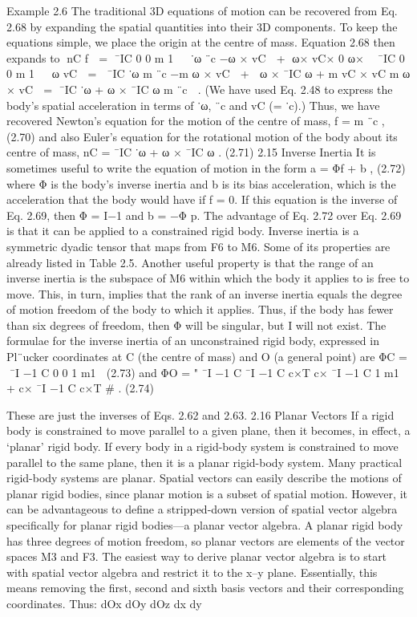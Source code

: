 Example 2.6 The traditional 3D equations of motion can be recovered from Eq. 2.68 by expanding the spatial quantities into their 3D components. To keep the equations simple, we place the origin at the centre of mass. Equation 2.68 then expands to nC f  = ¯IC 0 0 m 1   ˙ω ¨c −ω × vC  + ω× vC× 0 ω×  ¯IC 0 0 m 1   ω vC  =  ¯IC ˙ω m ¨c −m ω × vC  +  ω × ¯IC ω + m vC × vC m ω × vC  = ¯IC ˙ω + ω × ¯IC ω m ¨c  . (We have used Eq. 2.48 to express the body’s spatial acceleration in terms of ˙ω, ¨c and vC (= ˙c).) Thus, we have recovered Newton’s equation for the motion of the centre of mass, f = m ¨c , (2.70) and also Euler’s equation for the rotational motion of the body about its centre of mass, nC = ¯IC ˙ω + ω × ¯IC ω . (2.71) 2.15 Inverse Inertia It is sometimes useful to write the equation of motion in the form a = Φf + b , (2.72) where Φ is the body’s inverse inertia and b is its bias acceleration, which is the acceleration that the body would have if f = 0. If this equation is the inverse of Eq. 2.69, then Φ = I−1 and b = −Φ p. The advantage of Eq. 2.72 over Eq. 2.69 is that it can be applied to a constrained rigid body. Inverse inertia is a symmetric dyadic tensor that maps from F6 to M6. Some of its properties are already listed in Table 2.5. Another useful property is that the range of an inverse inertia is the subspace of M6 within which the body it applies to is free to move. This, in turn, implies that the rank of an inverse inertia equals the degree of motion freedom of the body to which it applies. Thus, if the body has fewer than six degrees of freedom, then Φ will be singular, but I will not exist. The formulae for the inverse inertia of an unconstrained rigid body, expressed in Pl¨ucker coordinates at C (the centre of mass) and O (a general point) are ΦC = ¯I −1 C 0 0 1 m1  (2.73) and ΦO = " ¯I −1 C ¯I −1 C c×T c× ¯I −1 C 1 m1 + c× ¯I −1 C c×T \# . (2.74)

These are just the inverses of Eqs. 2.62 and 2.63. 2.16 Planar Vectors If a rigid body is constrained to move parallel to a given plane, then it becomes, in effect, a ‘planar’ rigid body. If every body in a rigid-body system is constrained to move parallel to the same plane, then it is a planar rigid-body system. Many practical rigid-body systems are planar. Spatial vectors can easily describe the motions of planar rigid bodies, since planar motion is a subset of spatial motion. However, it can be advantageous to define a stripped-down version of spatial vector algebra specifically for planar rigid bodies—a planar vector algebra. A planar rigid body has three degrees of motion freedom, so planar vectors are elements of the vector spaces M3 and F3. The easiest way to derive planar vector algebra is to start with spatial vector algebra and restrict it to the x–y plane. Essentially, this means removing the first, second and sixth basis vectors and their corresponding coordinates. Thus: dOx dOy dOz dx dy

